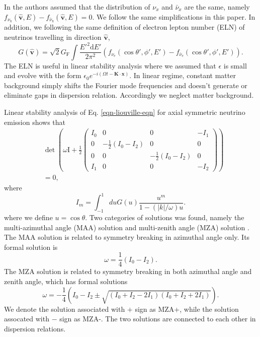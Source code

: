 \documentclass[%
preprint,
 amsmath,amssymb,
 aps,
 prd
]{revtex4-1}
\begin{document}
In  the authors assumed that the distribution of $\nu_x$ and $\bar\nu_x$ are the same, namely $ f_{\nu_{\mathrm x}}(\hat{\mathbf v},E)  - f_{\bar\nu_{\mathrm x}}(\hat{\mathbf v},E)=0$. We follow the same simplifications in this paper. In addition, we following the same definition of electron lepton number (ELN) of neutrinos travelling in direction $\hat{\mathbf v}$,
\begin{equation}
G(\hat{\mathbf v}) =  \sqrt{2}G_{\mathrm F} \int \frac{E'^2 \mathrm d E'}{2\pi^2} ( f_{\nu_{\mathrm e}}(\cos\theta',\phi',E')  - f_{\bar\nu_{\mathrm e}}(\cos\theta',\phi',E')  ).
\end{equation}
The ELN is useful in linear stability analysis where we assumed that $\epsilon$ is small and evolve with the form $\epsilon_0 e^{-i(\Omega t - \mathbf K\cdot \mathbf x)}$. In linear regime, constant matter background simply shifts the Fourier mode frequencies and doesn't generate or eliminate gaps in dispersion relation. Accordingly we neglect matter background.

Linear stability analysis of Eq. \eqref{eqn-liouville-eqn} for axial symmetric neutrino emission shows that
\begin{align}
&\det \left( \omega \mathrm{I} + \frac{1}{2}
\begin{pmatrix}
   I_0 & 0 & 0 & -I_1 \\
   0 & -\frac{1}{2} (I_0 - I_2) & 0 & 0 \\
   0 & 0 & -\frac{1}{2} (I_0 - I_2) & 0 \\
   I_1 & 0 & 0 & -I_2
\end{pmatrix}\right) \nonumber\\
&=0,
\label{eqn-det-polarization-tensor}
\end{align}
where
\begin{equation}
   I_m =\int_{-1}^{1} d u G(u) \frac{u^m}{1 -  \left(\lvert k\rvert /\omega\right) u }.
\end{equation}
where we define $u=\cos\theta$. Two categories of solutions was found, namely the multi-azimuthal angle (MAA) solution and multi-zenith angle (MZA) solution \cite{Raffelt2013}. The MAA solution is related to symmetry breaking in azimuthal angle only. Its formal solution is
\begin{equation}
   \omega = \frac{1}{4}(I_0 - I_2).
   \label{eqn-maa}
\end{equation}
The MZA solution is related to symmetry breaking in both azimuthal angle and zenith angle, which has formal solutions
\begin{equation}
\omega = - \frac{1}{4} \left( I_0 - I_2 \pm \sqrt{ (I_0 + I_2 - 2 I_1) (I_0 + I_2 + 2 I_1) } \right).
\label{eqn-mza}
\end{equation}
We denote the solution associated with $+$ sign as MZA+, while the solution assocated with $-$ sign as MZA-. The two solutions are connected to each other in dispersion relations.
\end{document}
